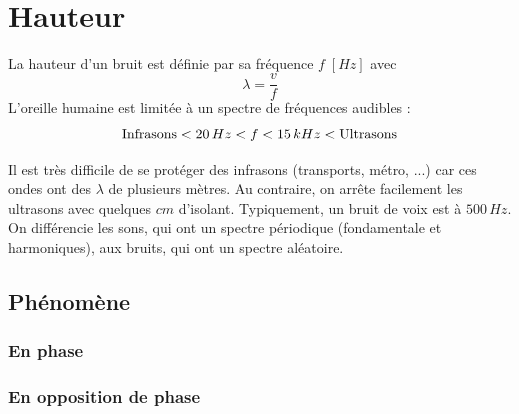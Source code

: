 \documentclass[11pt]{report}
\begin{document}
\\

\section{Hauteur}
\label{high}
La hauteur d'un bruit est définie par sa fréquence $f\;[Hz]$ avec 
$$\lambda = \frac{v}{f}$$
L'oreille humaine est limitée à un spectre de fréquences audibles :
$$\textup{Infrasons} < 20 \,Hz < f < 15 \,kHz < \textup{Ultrasons}$$

Il est très difficile de se protéger des infrasons (transports, métro, ...) car ces ondes ont des $\lambda$ de plusieurs mètres. Au contraire, on arrête facilement les ultrasons avec quelques $cm$ d'isolant. Typiquement, un bruit de voix est à $500\,Hz$.\\

On différencie les sons, qui ont un spectre périodique (fondamentale et harmoniques), aux bruits, qui ont un spectre aléatoire.



\subsection{Phénomène}
\subsubsection{En phase}
\subsubsection{En opposition de phase}
\end{document}
